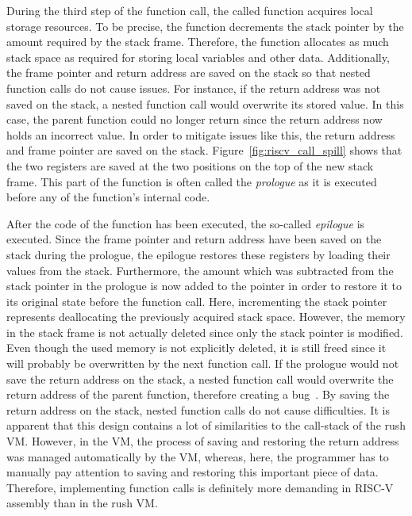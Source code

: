 During the third step of the function call, the called function acquires local storage resources.
To be precise, the function decrements the stack pointer by the amount required by the stack frame.
Therefore, the function allocates as much stack space as required for storing local variables and other data.
Additionally, the frame pointer and return address are saved on the stack so that nested function calls do not cause issues.
For instance, if the return address was not saved on the stack, a nested function call would overwrite its stored value.
In this case, the parent function could no longer return since the return address now holds an incorrect value.
In order to mitigate issues like this, the return address and frame pointer are saved on the stack.
Figure~\ref{fig:riscv_call_spill} shows that the two registers are saved at the two positions on the top of the new stack frame.
This part of the function is often called the \emph{prologue} as it is executed before any of the function's internal code.

After the code of the function has been executed, the so-called \emph{epilogue} is executed.
Since the frame pointer and return address have been saved on the stack during the prologue,
the epilogue restores these registers by loading their values from the stack.
Furthermore, the amount which was subtracted from the stack pointer in the prologue is now added to the pointer in order to restore it to its original state before the function call.
Here, incrementing the stack pointer represents deallocating the previously acquired stack space.
However, the memory in the stack frame is not actually deleted since only the stack pointer is modified.
Even though the used memory is not explicitly deleted, it is still freed since it will probably be overwritten by the next function call.
If the prologue would not save the return address on the stack, a nested function call would overwrite the return address of the parent function, therefore creating a bug~\cite[p.33]{Patterson2017}.
By saving the return address on the stack, nested function calls do not cause difficulties.
It is apparent that this design contains a lot of similarities to the call-stack of the rush VM\@.
However, in the VM, the process of saving and restoring the return address was managed automatically by the VM,
whereas, here, the programmer has to manually pay attention to saving and restoring this important piece of data.
Therefore, implementing function calls is definitely more demanding in RISC-V assembly than in the rush VM\@.

